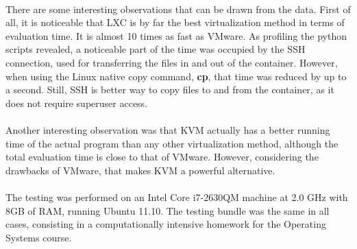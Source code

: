 \paragraph { }

There are some interesting observations that can be drawn from the data. First
of all, it is noticeable that LXC is by far the best virtualization method
in terms of evaluation time. It is almost 10 times as fast as VMware.
As profiling the python scripts revealed, a noticeable part of the time
was occupied by the SSH connection, used for transferring the files in and out
of the container. However, when using the Linux native copy command, {\bf cp},
that time was reduced by up to a second. Still, SSH is better way to
copy files to and from the container, as it does not require superuser access.

\paragraph { }

Another interesting observation was that KVM actually has a better running
time of the actual program than any other virtualization method,
 although the total evaluation time is close to that of VMware. 
 However, considering the drawbacks of VMware, that makes KVM a powerful
alternative.

\paragraph { } 

The testing was performed on an Intel Core i7-2630QM machine at 2.0 GHz with 8GB
of RAM, running Ubuntu 11.10. The testing bundle was the same in all cases,
consisting in a computationally intensive homework for the Operating Systems course.


